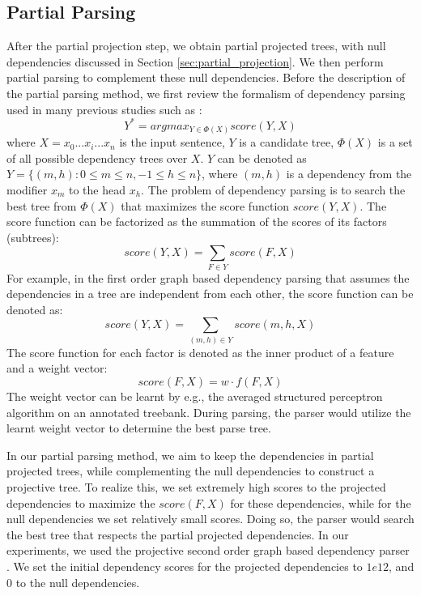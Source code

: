 \documentclass[english]{jnlp_1.4}
\begin{document}
\subsection{Partial Parsing}
\label{sec:partial_parsing}

After the partial projection step, we obtain partial projected trees, with null dependencies
discussed in Section \ref{sec:partial_projection}. We then perform partial parsing to
complement these null dependencies. Before the description of the partial parsing method,
we first review the formalism of dependency parsing  used in many previous studies such as 
\cite{Kubler:2009:DP:1538443,shen-kawahara-kurohashi:2012:PACLIC}:
\begin{equation}
Y^*=argmax_{Y \in \Phi(X)}score(Y, X)
\end{equation}
where {$X=x_0...x_i...x_n$} is the input sentence, $Y$ is a candidate tree, $\Phi(X)$ is
a set of all possible dependency trees over $X$. $Y$ can be denoted as 
{$Y=\{(m,h):0\le{m}\leq{n},-1\leq{h}\leq{n}\}$}, where $(m,h)$ is a dependency from the modifier 
$x_m$ to the head $x_h$. The problem of dependency parsing is to search the best tree from 
$\Phi(X)$ that maximizes the score function $score(Y, X)$. 
The score function can be factorized as the summation of the scores of its factors (subtrees):
\begin{equation}
score(Y, X)=\sum_{F \in Y}score(F, X)
\end{equation}
For example, in the first order graph based dependency parsing that assumes the dependencies
in a tree are independent from each other, the score function can be denoted as:
\begin{equation}
score(Y, X)=\sum_{(m,h) \in Y}score(m,h,X)
\end{equation}
The score function for each factor is denoted as the inner product of a feature
and a weight vector:
\begin{equation}
score(F, X)=w \cdot f(F, X)
\end{equation}
The weight vector can be learnt by e.g., the averaged structured perceptron algorithm \cite{collins:2002:EMNLP02}
on an annotated treebank. During parsing, the parser would utilize the learnt weight vector
to determine the best parse tree.

In our partial parsing method, we aim to keep the dependencies in partial projected trees, while
complementing the null dependencies to construct a projective tree. To realize this, we set extremely 
high scores to the projected dependencies to maximize the $score(F, X)$ for these dependencies, 
while for the null dependencies we set relatively small scores.
Doing so, the parser would search the best tree that respects the partial projected
dependencies. In our experiments, we used the projective second order graph based dependency parser
\cite{shen-kawahara-kurohashi:2012:PACLIC}. We set the initial dependency
scores for the projected dependencies to $1e12$, and $0$ to the null dependencies. 
\end{document}
